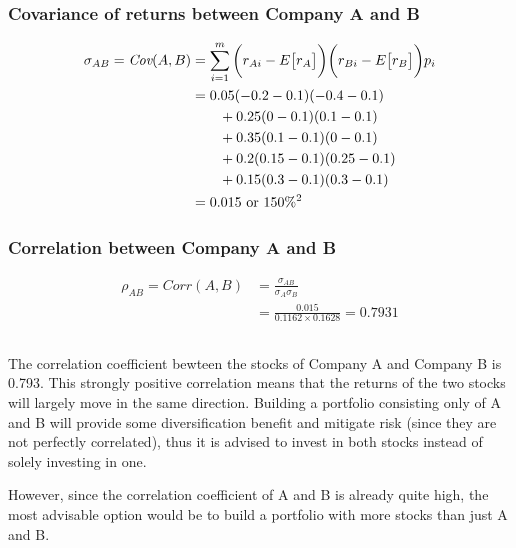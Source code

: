 \documentclass[12pt]{article}
\begin{document}
\subsubsection{Covariance of returns between Company A and B}
\begin{align*}
	\sigma_{AB} = \textit{Cov}(A,B) &= \sum^{m}_{i=1}\bigg(r_{Ai}-E\big[r_A\big]\bigg)\bigg(r_{Bi}-E\big[r_B\big]\bigg)p_i\\
	&=0.05(-0.2-0.1)(-0.4-0.1)\\
	&\text{\qquad}+0.25(0-0.1)(0.1-0.1)\\
	&\text{\qquad}+0.35(0.1-0.1)(0-0.1)\\
	&\text{\qquad}+0.2(0.15-0.1)(0.25-0.1)\\
	&\text{\qquad}+0.15(0.3-0.1)(0.3-0.1)\\
	&= 0.015 \text{ or } 150\%^2
\end{align*}

\subsubsection{Correlation between Company A and B}
\begin{align*}
	\rho_{AB} = \textit{Corr}(A,B) &= \frac{\sigma_{AB}}{\sigma_A\sigma_B}\\
	& = \frac{0.015}{0.1162\times0.1628} = 0.7931
\end{align*}

\subsection{}
The correlation coefficient bewteen the stocks of Company A and Company B is 0.793. This strongly positive correlation means that the returns of the two stocks will largely move in the same direction. Building a portfolio consisting only of A and B will provide some diversification benefit and mitigate risk (since they are not perfectly correlated), thus it is advised to invest in both stocks instead of solely investing in one.

However, since the correlation coefficient of A and B is already quite high, the most advisable option would be to build a portfolio with more stocks than just A and B.
\end{document}
